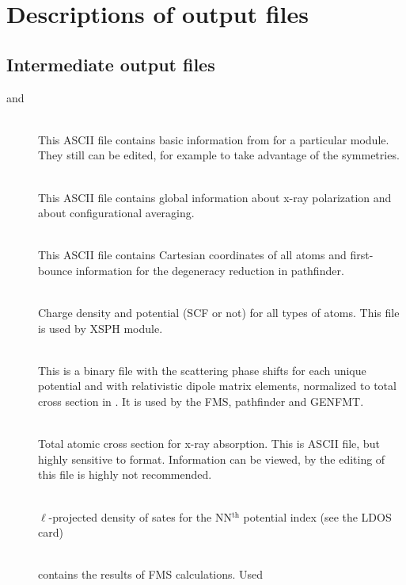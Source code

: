 \documentclass[11pt,oneside]{report} %
\begin{document}
\section{Descriptions of output files}
\label{sec:Descr-Outp-Files}

\subsection{Intermediate output files}
\label{sec:Interm-Outp-Files}

\begin{description}
\item[ and ]\hfill\\ This ASCII file contains
   basic information 
  from  for a particular module. They still can be edited,
  for example to take advantage of the symmetries.
\item[ ]\hfill\\ This ASCII file contains
   global information  about x-ray polarization and about
   configurational averaging.
\item[ ]\hfill\\ This ASCII file contains
   Cartesian coordinates of all atoms and first-bounce information 
   for the  degeneracy reduction in pathfinder.
\item[]\hfill\\ Charge density and potential (SCF or not) for
  all types of atoms. This file is used by XSPH module.
\item[]\hfill\\ This is a binary file with the scattering
  phase shifts for each unique potential and with relativistic dipole matrix
  elements, normalized to total cross section in .
  It is used by the FMS, pathfinder and GENFMT.
\item[]\hfill\\ Total atomic cross section for x-ray
  absorption. This is ASCII file, but highly sensitive to format. Information
  can be viewed, by the editing of this file is highly not recommended.
\item[]\hfill\\ $\ell$-projected density of sates for the
  NN$^{\mathrm{th}}$ potential index (see the LDOS card)
\item[]\hfill\\ contains the results of FMS calculations. Used

\end{description}
\end{document}
